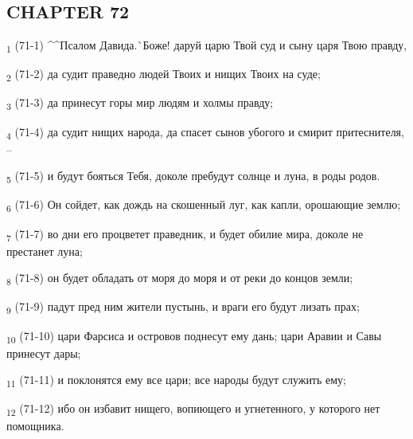 \subsection{CHAPTER 72}
\begin{tcolorbox}
\textsubscript{1} (71-1) ^^Псалом Давида.^^ Боже! даруй царю Твой суд и сыну царя Твою правду,
\end{tcolorbox}
\begin{tcolorbox}
\textsubscript{2} (71-2) да судит праведно людей Твоих и нищих Твоих на суде;
\end{tcolorbox}
\begin{tcolorbox}
\textsubscript{3} (71-3) да принесут горы мир людям и холмы правду;
\end{tcolorbox}
\begin{tcolorbox}
\textsubscript{4} (71-4) да судит нищих народа, да спасет сынов убогого и смирит притеснителя, --
\end{tcolorbox}
\begin{tcolorbox}
\textsubscript{5} (71-5) и будут бояться Тебя, доколе пребудут солнце и луна, в роды родов.
\end{tcolorbox}
\begin{tcolorbox}
\textsubscript{6} (71-6) Он сойдет, как дождь на скошенный луг, как капли, орошающие землю;
\end{tcolorbox}
\begin{tcolorbox}
\textsubscript{7} (71-7) во дни его процветет праведник, и будет обилие мира, доколе не престанет луна;
\end{tcolorbox}
\begin{tcolorbox}
\textsubscript{8} (71-8) он будет обладать от моря до моря и от реки до концов земли;
\end{tcolorbox}
\begin{tcolorbox}
\textsubscript{9} (71-9) падут пред ним жители пустынь, и враги его будут лизать прах;
\end{tcolorbox}
\begin{tcolorbox}
\textsubscript{10} (71-10) цари Фарсиса и островов поднесут ему дань; цари Аравии и Савы принесут дары;
\end{tcolorbox}
\begin{tcolorbox}
\textsubscript{11} (71-11) и поклонятся ему все цари; все народы будут служить ему;
\end{tcolorbox}
\begin{tcolorbox}
\textsubscript{12} (71-12) ибо он избавит нищего, вопиющего и угнетенного, у которого нет помощника.
\end{tcolorbox}
